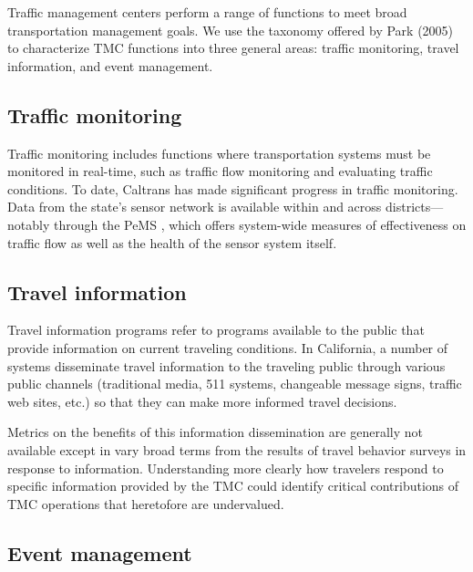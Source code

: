 \documentclass[12pt]{report}
\newcounter{time}
\begin{document}
Traffic management centers perform a range of functions to meet broad
transportation management goals. We use the taxonomy offered by Park
(2005) to characterize \ac{TMC} functions into three general areas: traffic
monitoring, travel information, and event management.

\subsection{Traffic monitoring}
\label{sec:traf-mon}

Traffic monitoring includes functions where transportation systems
must be monitored in real-time, such as traffic flow monitoring and
evaluating traffic conditions. To date, Caltrans has made significant
progress in traffic monitoring. Data from the state's sensor network
is available within and across districts---notably through the
\acf{PeMS} \citep{choe02:_freew_perfor_measur_system_pems}, which
offers system-wide measures of effectiveness on traffic flow as well
as the health of the sensor system itself.

\subsection{Travel information}
\label{sec:trav-info}

Travel information programs refer to programs available to the public
that provide information on current traveling conditions. In
California, a number of systems disseminate travel information to the
traveling public through various public channels (traditional media,
511 systems, changeable message signs, traffic web sites, etc.) so
that they can make more informed travel decisions.

Metrics on the benefits of this information dissemination are
generally not available except in vary broad terms from the results of
travel behavior surveys in response to information. Understanding more
clearly how travelers respond to specific information provided by the
\ac{TMC} could identify critical contributions of \ac{TMC} operations that
heretofore are undervalued.

\subsection{Event management}
\label{sec:event-man}
\end{document}
